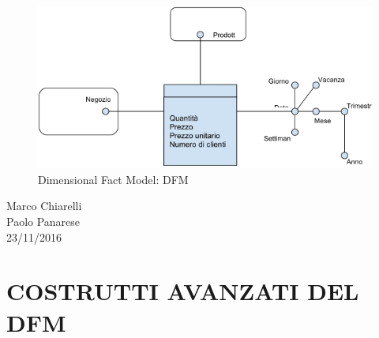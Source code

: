 \begin{center}
\begin{figure}[H]
\centering
\includegraphics[scale=1]{figures/fact_model.png}
\caption{Dimensional Fact Model: DFM}
\end{figure}
\end{center}



\begin{flushright}Marco Chiarelli\\Paolo Panarese\\23/11/2016\end{flushright}


\section{COSTRUTTI AVANZATI DEL DFM}

